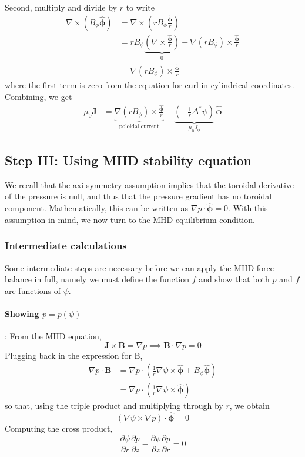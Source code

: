 \documentclass[11pt,a4paper]{article}
\begin{document}
    Second, multiply and divide by $r$ to write 
    $$
    \begin{aligned}
        \nabla \times(B_\phi \hat{\boldsymbol{\phi}}) &= \nabla\times(rB_\phi\frac{\hat{\boldsymbol{\phi}}}{r}) \\
        &= rB_\phi\underbrace{(\nabla\times\frac{\hat{\boldsymbol{\phi}}}{r})}_{0}+\nabla(rB_\phi)\times\frac{\hat{\boldsymbol{\phi}}}{r} \\
        &= \nabla(rB_\phi)\times\frac{\hat{\boldsymbol{\phi}}}{r}
    \end{aligned}
    $$
    where the first term is zero from the equation for curl in cylindrical coordinates.
    Combining, we get
    $$\begin{aligned}
        \mu_0\mathbf{J}&=\underbrace{\nabla(rB_\phi)\times\frac{\hat{\boldsymbol{\phi}}}{r}}_{\text{poloidal current}}+ \underbrace{\left(-\frac{1}{r}\Delta^*\psi\right)}_{\mu_0J_\phi}\,\hat{\boldsymbol{\phi}}
    \end{aligned}
    $$
    
\subsection{Step III: Using MHD stability equation}
    We recall that the axi-symmetry assumption implies that the toroidal derivative of the pressure is null, and thus that the pressure gradient has no toroidal component. Mathematically, this can be written as $\nabla p \cdot \hat{\boldsymbol{\phi}}=0$. With this assumption in mind, we now turn to the MHD equilibrium condition. 

    \subsubsection{Intermediate calculations}
    Some intermediate steps are necessary before we can apply the MHD force balance in full, namely we must define the function $f$ and show that both $p$ and $f$ are functions of $\psi$.
    
    \paragraph{Showing $p=p(\psi)$}: From the MHD equation,
    $$\mathbf{J}\times\mathbf{B}=\nabla p \implies \mathbf{B}\cdot\nabla p =0$$
    Plugging back in the expression for B,
    $$\begin{aligned}
        \nabla p \cdot \mathbf{B}&=\nabla p \cdot \left(\frac{1}{r} \nabla\psi\times\hat{\boldsymbol{\phi}}+B_\phi \hat{\boldsymbol{\phi}}\right) \\
        &= \nabla p \cdot \left(\frac{1}{r} \nabla\psi\times\hat{\boldsymbol{\phi}}\right) 
    \end{aligned}
    $$
    so that, using the triple product and multiplying through by $r$, we obtain
    $$(\nabla \psi \times \nabla p) \cdot \hat{\boldsymbol{\phi}}=0$$
    Computing the cross product,
    $$ \frac{\partial \psi}{\partial r} \frac{\partial p}{\partial z} - \frac{\partial \psi}{\partial z}\frac{\partial p}{\partial r}=0$$
    
\end{document}
